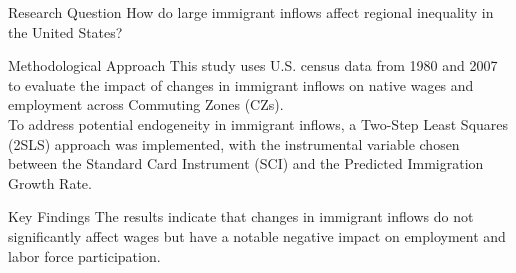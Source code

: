\begin{frame}

    \begin{block}{Research Question}
    How do large immigrant inflows affect regional inequality in the United States?
    \end{block}
    
    \begin{block}{Methodological Approach} 
    This study uses U.S. census data from 1980 and 2007 to evaluate the impact of changes in immigrant inflows on native wages and employment across Commuting Zones (CZs). \\

    To address potential endogeneity in immigrant inflows, a Two-Step Least Squares (2SLS) approach was implemented, with the instrumental variable chosen between the Standard Card Instrument (SCI) and the Predicted Immigration Growth Rate.
    \end{block}
    
    \begin{block}{Key Findings} 
        The results indicate that changes in immigrant inflows do not significantly affect wages but have a notable negative impact on employment and labor force participation.
    \end{block}
    
    
\end{frame}

